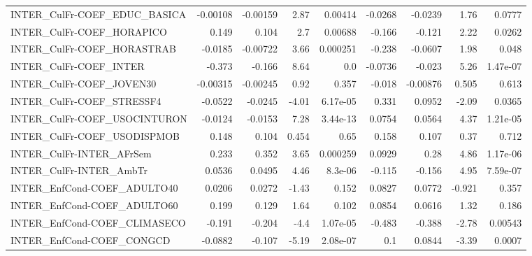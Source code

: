 \begin{tabular}{lrrrrrrrr}
INTER\_CulFr-COEF\_EDUC\_BASICA          &    -0.00108 &     -0.00159 &     2.87 &  0.00414 &    -0.0268 &     -0.0239 &         1.76 &        0.0777 \\
INTER\_CulFr-COEF\_HORAPICO             &       0.149 &        0.104 &      2.7 &  0.00688 &     -0.166 &      -0.121 &         2.22 &        0.0262 \\
INTER\_CulFr-COEF\_HORASTRAB            &     -0.0185 &     -0.00722 &     3.66 & 0.000251 &     -0.238 &     -0.0607 &         1.98 &         0.048 \\
INTER\_CulFr-COEF\_INTER                &      -0.373 &       -0.166 &     8.64 &      0.0 &    -0.0736 &      -0.023 &         5.26 &      1.47e-07 \\
INTER\_CulFr-COEF\_JOVEN30              &    -0.00315 &     -0.00245 &     0.92 &    0.357 &     -0.018 &    -0.00876 &        0.505 &         0.613 \\
INTER\_CulFr-COEF\_STRESSF4             &     -0.0522 &      -0.0245 &    -4.01 & 6.17e-05 &      0.331 &      0.0952 &        -2.09 &        0.0365 \\
INTER\_CulFr-COEF\_USOCINTURON          &     -0.0124 &      -0.0153 &     7.28 & 3.44e-13 &     0.0754 &      0.0564 &         4.37 &      1.21e-05 \\
INTER\_CulFr-COEF\_USODISPMOB           &       0.148 &        0.104 &    0.454 &     0.65 &      0.158 &       0.107 &         0.37 &         0.712 \\
INTER\_CulFr-INTER\_AFrSem              &       0.233 &        0.352 &     3.65 & 0.000259 &     0.0929 &        0.28 &         4.86 &      1.17e-06 \\
INTER\_CulFr-INTER\_AmbTr               &      0.0536 &       0.0495 &     4.46 &  8.3e-06 &     -0.115 &      -0.156 &         4.95 &      7.59e-07 \\
INTER\_EnfCond-COEF\_ADULTO40           &      0.0206 &       0.0272 &    -1.43 &    0.152 &     0.0827 &      0.0772 &       -0.921 &         0.357 \\
INTER\_EnfCond-COEF\_ADULTO60           &       0.199 &        0.129 &     1.64 &    0.102 &     0.0854 &      0.0616 &         1.32 &         0.186 \\
INTER\_EnfCond-COEF\_CLIMASECO          &      -0.191 &       -0.204 &     -4.4 & 1.07e-05 &     -0.483 &      -0.388 &        -2.78 &       0.00543 \\
INTER\_EnfCond-COEF\_CONGCD             &     -0.0882 &       -0.107 &    -5.19 & 2.08e-07 &        0.1 &      0.0844 &        -3.39 &        0.0007 \\

\end{tabular}
